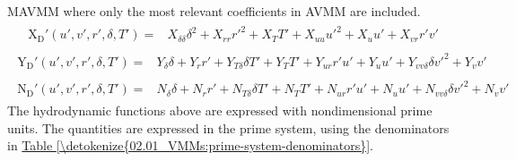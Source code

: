 \documentclass[review]{elsarticle}
\begin{document}
\sphinxAtStartPar
MAVMM where only the most relevant coefficients in AVMM are included.
\begin{equation}\label{equation:02.01_VMMs:eqxmartinssimple}
\begin{split}\begin{split}
\operatorname{X_{D}'}{\left(u',v',r',\delta,T' \right)} = & X_{\delta\delta} \delta^{2} + X_{rr} r'^{2} + X_{T} T' + X_{uu} u'^{2} + X_{u} u' + X_{vr} r' v' 
\end{split}\end{split}
\end{equation}\begin{equation}\label{equation:02.01_VMMs:eqymartinssimple}
\begin{split}\begin{split}
\operatorname{Y_{D}'}{\left(u',v',r',\delta,T' \right)} = & Y_{\delta} \delta + Y_{r} r' + Y_{T\delta} \delta T' + Y_{T} T' + Y_{ur} r' u' + Y_{u} u' + Y_{vv\delta} \delta v'^{2} + Y_{v} v' 
\end{split}\end{split}
\end{equation}\begin{equation}\label{equation:02.01_VMMs:eqnmartinssimple}
\begin{split}\begin{split}
\operatorname{N_{D}'}{\left(u',v',r',\delta,T' \right)} = & N_{\delta} \delta + N_{r} r' + N_{T\delta} \delta T' + N_{T} T' + N_{ur} r' u' + N_{u} u' + N_{vv\delta} \delta v'^{2} + N_{v} v' 
\end{split}\end{split}
\end{equation}
\sphinxAtStartPar
The hydrodynamic functions above are expressed with nondimensional prime units. The quantities are expressed in the prime system, using the denominators in \hyperref[\detokenize{02.01_VMMs:prime-system-denominators}]{Table \ref{\detokenize{02.01_VMMs:prime-system-denominators}}}.
\end{document}
